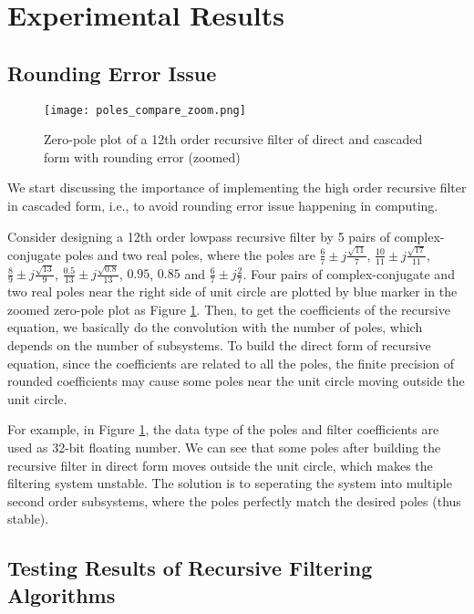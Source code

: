 \section{Experimental Results}
\label{sec:experiment}

\subsection{Rounding Error Issue}

\begin{figure}[t]
    \centerline{\texttt{[image: poles\_compare\_zoom.png]}}
    \caption{Zero-pole plot of a 12th order recursive filter of direct and cascaded form with rounding error (zoomed)}
    \label{fig:poles_compare_zoom}
\end{figure}

We start discussing the importance of implementing the high order recursive filter in cascaded form, i.e.,
to avoid rounding error issue happening in computing. 

Consider designing a 12th order lowpass recursive filter by 5 pairs of complex-conjugate poles and two real poles, where the poles are
$\frac{6}{7} \pm j\frac{\sqrt{11}}{7}$, $\frac{10}{11} \pm j\frac{\sqrt{17}}{11}$, $\frac{8}{9} \pm j\frac{\sqrt{13}}{9}$, $\frac{0.5}{13} \pm j\frac{\sqrt{0.8}}{13}$,
$0.95$, $0.85$ and $\frac{6}{7} \pm j\frac{2}{7}$. Four pairs of complex-conjugate and two real poles near the
right side of unit circle are plotted by blue marker
in the zoomed zero-pole plot as Figure \ref{fig:poles_compare_zoom}.
Then, to get the coefficients of the recursive equation, we basically do the convolution with the number of poles, which depends on
the number of subsystems. 
To build the direct form of recursive equation,
since the coefficients are related to all the poles,
the finite precision of rounded coefficients
may cause some poles near the unit circle moving outside the unit circle.

For example, in Figure \ref{fig:poles_compare_zoom}, the data type of the poles and filter coefficients are used as 32-bit floating number.
We can see that some poles after building the recursive filter in direct form 
moves outside the unit circle, which makes the filtering system unstable.
The solution is to seperating the system into multiple second order subsystems,
where the poles perfectly match the desired poles (thus stable).

\subsection{Testing Results of Recursive Filtering Algorithms}

